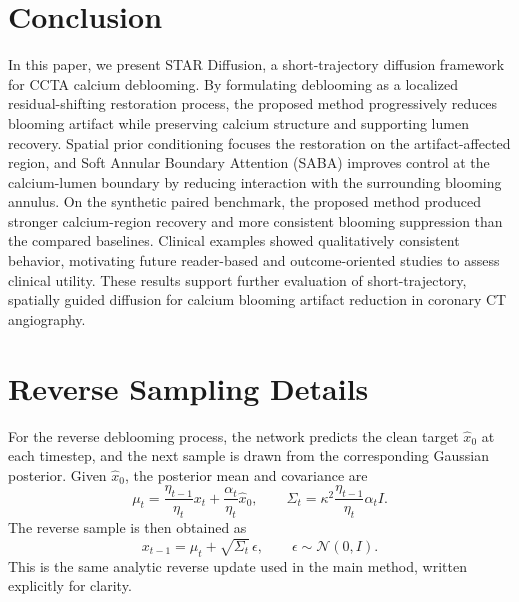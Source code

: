 \documentclass[singleLetter,times]{sagej}
\begin{document}
\section{Conclusion}

In this paper, we present STAR Diffusion, a short-trajectory diffusion framework for CCTA calcium deblooming. By formulating deblooming as a localized residual-shifting restoration process, the proposed method progressively reduces blooming artifact while preserving calcium structure and supporting lumen recovery. Spatial prior conditioning focuses the restoration on the artifact-affected region, and Soft Annular Boundary Attention (SABA) improves control at the calcium-lumen boundary by reducing interaction with the surrounding blooming annulus. On the synthetic paired benchmark, the proposed method produced stronger calcium-region recovery and more consistent blooming suppression than the compared baselines. Clinical examples showed qualitatively consistent behavior, motivating future reader-based and outcome-oriented studies to assess clinical utility. These results support further evaluation of short-trajectory, spatially guided diffusion for calcium blooming artifact reduction in coronary CT angiography.

\appendix
\section{Reverse Sampling Details}
\label{supp:reverse_sampling}

For the reverse deblooming process, the network predicts the clean target $\hat{x}_0$ at each timestep, and the next sample is drawn from the corresponding Gaussian posterior. Given $\hat{x}_0$, the posterior mean and covariance are
\[
\mu_t
=
\frac{\eta_{t-1}}{\eta_t}x_t
+
\frac{\alpha_t}{\eta_t}\hat{x}_0,
\qquad
\Sigma_t
=
\kappa^2\frac{\eta_{t-1}}{\eta_t}\alpha_t I .
\]
The reverse sample is then obtained as
\[
x_{t-1}
=
\mu_t + \sqrt{\Sigma_t}\,\epsilon,
\qquad \epsilon \sim \mathcal{N}(0,I).
\]
This is the same analytic reverse update used in the main method, written explicitly for clarity.
\end{document}
